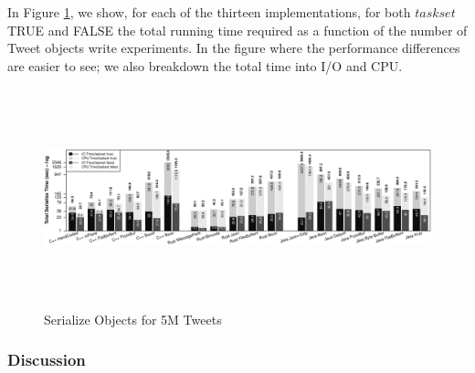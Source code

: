 In Figure \ref{fig:exp_serialization_bar}, we show, for each of the thirteen implementations, for both $taskset$ TRUE and FALSE the total running time required as a function of the number of Tweet objects write experiments. In the figure where the
performance differences are easier to see; we also breakdown
the total time into I/O and CPU.
\begin{figure}
	\centering
	\includegraphics[width=\linewidth ,height=2.5in,keepaspectratio]{../../RScripts/Experiment_SerializeObjects_Bar.pdf}
	\caption{Serialize Objects for 5M Tweets}
	\label{fig:exp_serialization_bar}
\end{figure}

\subsubsection{Discussion}
